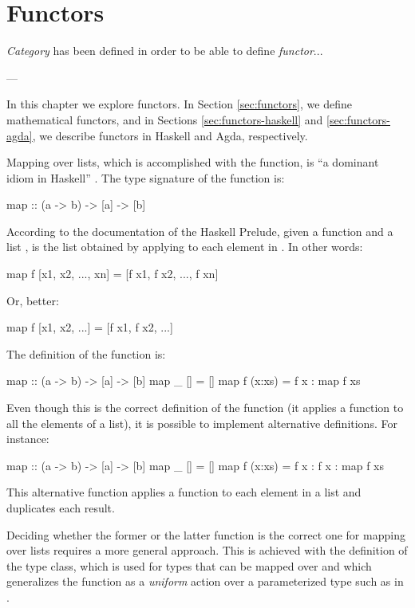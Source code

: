 \chapter{Functors}
\label{chap:functors}

\epigraph{
  \emph{Category} has been defined in order to be able to
  define \emph{functor}...
}{---\textcite[18]{maclane-1998}}


In this chapter we explore functors. In Section \ref{sec:functors}, we
define mathematical functors, and in Sections
\ref{sec:functors-haskell} and \ref{sec:functors-agda}, we describe
functors in Haskell and Agda, respectively.

Mapping over lists, which is accomplished with the 
function, is ``a dominant idiom in Haskell''
\parencite[146]{lipovaca-2011}. The type signature of the
 function is:
\begin{codehaskell}
map :: (a -> b) -> [a] -> [b]
\end{codehaskell}
According to the documentation of the Haskell Prelude, given a
function  and a list ,  is the list obtained by applying  to each
element in . In other words:
\begin{codehaskell}
map f [x1, x2, ..., xn] = [f x1, f x2, ..., f xn]
\end{codehaskell}
Or, better:
\begin{codehaskell}
map f [x1, x2, ...] = [f x1, f x2, ...]
\end{codehaskell}
The definition of the  function is:
\begin{codehaskell}
map :: (a -> b) -> [a] -> [b]
map _ []     = []
map f (x:xs) = f x : map f xs
\end{codehaskell}

Even though this is the correct definition of the 
function (it applies a function to all the elements of a list), it is
possible to implement alternative definitions. For instance:
\begin{codehaskell}
map :: (a -> b) -> [a] -> [b]
map _ []     = []
map f (x:xs) = f x : f x : map f xs
\end{codehaskell}
This alternative  function applies a function to each
element in a list and duplicates each result.

Deciding whether the former or the latter  function
is the correct one for mapping over lists requires a more general
approach. This is achieved with the definition of the
 type class, which is used for types that can be
mapped over and which generalizes the  function as a
\emph{uniform} action over a parameterized type such as
\texthaskell{[a]} in .

